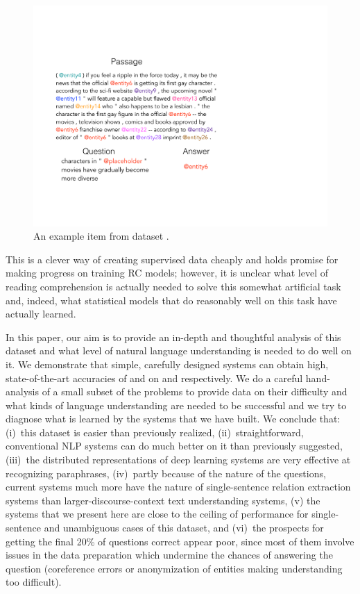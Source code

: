 \begin{figure}
\centering
\includegraphics[scale=0.38]{figures/fig_example.pdf}
\vspace{-2em}
\caption{An example item from dataset .}
\label{fig:example}
\end{figure}

This is a clever way of creating supervised data cheaply and holds promise for making progress on training RC models; however, it is unclear what level of reading comprehension is actually needed to solve this somewhat artificial task and, indeed, what statistical models that do reasonably well on this task have actually learned.

In this paper, our aim is to provide an in-depth and thoughtful analysis of this dataset and what level of natural language understanding is needed to do well on it. We demonstrate that simple, carefully designed systems can obtain high, state-of-the-art accuracies of  {\finalcnn} and {\finaldm} on  and  respectively. We do a careful hand-analysis of a small subset of the problems to provide data on their difficulty and what kinds of language understanding are needed to be successful and we try to diagnose what is learned by the systems that we have built.  We conclude that: (i)~this dataset is easier than previously realized, (ii)~straightforward, conventional NLP systems can do much better on it than previously suggested, (iii)~the distributed representations of deep learning systems are very effective at recognizing paraphrases, (iv)~partly because of the nature of the questions, current systems much more have the nature of single-sentence relation extraction systems than larger-discourse-context text understanding systems, (v) the systems that we present here are close to the ceiling of performance for single-sentence and unambiguous cases of this dataset, and (vi)~the prospects for getting the final 20\% of questions correct appear poor, since most of them involve issues in the data preparation which undermine the chances of answering the question (coreference errors or anonymization of entities making understanding too difficult).

